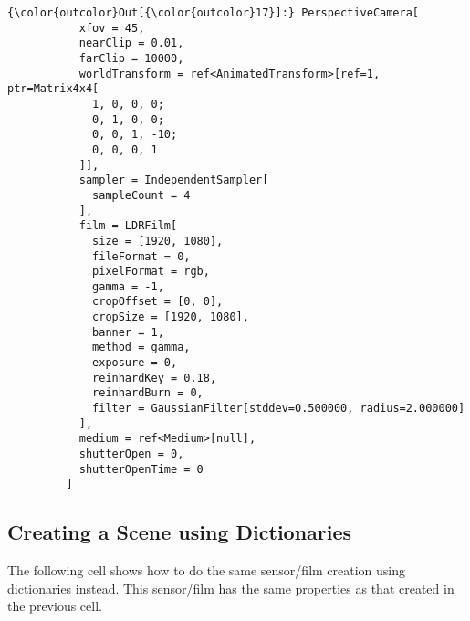 \documentclass[11pt, a4paper, landscape]{scrartcl}
\begin{document}
            \begin{Verbatim}[commandchars=\\\{\}]
{\color{outcolor}Out[{\color{outcolor}17}]:} PerspectiveCamera[
           xfov = 45,
           nearClip = 0.01,
           farClip = 10000,
           worldTransform = ref<AnimatedTransform>[ref=1, ptr=Matrix4x4[
             1, 0, 0, 0;
             0, 1, 0, 0;
             0, 0, 1, -10;
             0, 0, 0, 1
           ]],
           sampler = IndependentSampler[
             sampleCount = 4
           ],
           film = LDRFilm[
             size = [1920, 1080],
             fileFormat = 0,
             pixelFormat = rgb,
             gamma = -1,
             cropOffset = [0, 0],
             cropSize = [1920, 1080],
             banner = 1,
             method = gamma,
             exposure = 0,
             reinhardKey = 0.18,
             reinhardBurn = 0,
             filter = GaussianFilter[stddev=0.500000, radius=2.000000]
           ],
           medium = ref<Medium>[null],
           shutterOpen = 0,
           shutterOpenTime = 0
         ]
\end{Verbatim}
        
    \subsection{Creating a Scene using
Dictionaries}\label{creating-a-scene-using-dictionaries}

The following cell shows how to do the same sensor/film creation using
dictionaries instead. This sensor/film has the same properties as that
created in the previous cell.
\end{document}
